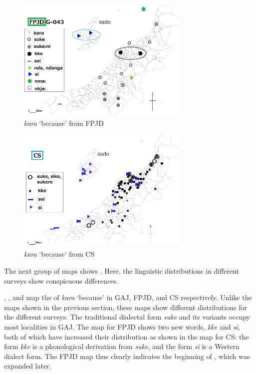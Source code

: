 \documentclass[output=paper]{LSP/langsci}
\begin{document}
\begin{figure}
\includegraphics[width=0.75\textwidth]{illustrations/fuku2_fig4b}
\caption{\textit{kara} `because' from FPJD}
\label{fig:4b}
\end{figure}

\begin{figure}
\includegraphics[width=0.75\textwidth]{illustrations/fuku2_fig4c}
\caption{\textit{kara} `because' from CS}
\label{fig:4c}
\end{figure}

The next group of maps shows . Here, the linguistic distributions in different surveys show conspicuous differences. 

, , and  map the  of \textit{kara} `because'  in \textsc{GAJ}, \textsc{FPJD}, and \textsc{CS} respectively.  Unlike the maps shown in the previous section, these maps show different distributions for the different surveys.  The traditional dialectal form \textit{suke} and its variants occupy most localities in \textsc{GAJ}.  The map for \textsc{FPJD} shows two new words, \textit{kke} and \textit{si}, both of which have increased their distribution as shown in the map for \textsc{CS}: the form \textit{kke} is a phonological derivation from \textit{suke}, and the form \textit{si} is a Western dialect form.  The \textsc{FPJD} map thus clearly indicates the beginning of , which was expanded later.
\end{document}
